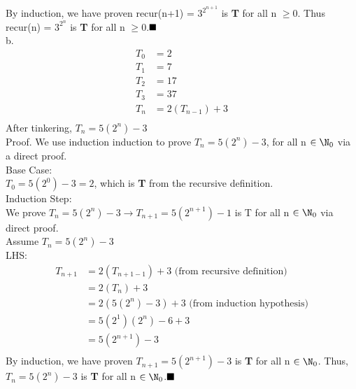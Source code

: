 \documentclass{article}
\begin{document}
\begin{itemize}
	By induction, we have proven recur(n+1) = $ 3^{2^{n+1}}$ is \textbf{T} for all n $\ge 0$. Thus recur(n) = $ 3^{2^n}$ is \textbf{T} for all n $\ge 0$.$\hfill\blacksquare$\\
b.
\begin{align*}
T_0 &= 2\\
T_1 &= 7\\
T_2 &= 17\\
T_3 &= 37\\ 
T_n &= 2(T_{n-1}) + 3\\
\end{align*}
After tinkering, $T_n = 5(2^n) - 3$\\
Proof.  We use induction induction to prove  $T_n = 5(2^n) - 3$, for all n $\in \N_0$ via a direct proof.\\
Base Case:\\
 $T_0 = 5(2^0) - 3 = 2$, which is \textbf{T} from the recursive definition.\\
 Induction Step:\\
 We prove  $T_n = 5(2^n) - 3 \rightarrow  T_{n+1} = 5(2^{n+1}) - 1$ is T for all n $\in \N_0$ via direct proof.\\
 Assume  $T_n = 5(2^n) - 3$\\
 LHS:\\
 \begin{align*}
  T_{n+1} &= 2(T_{n + 1 - 1}) + 3  \text{ (from recursive definition)}\\
  &= 2(T_n) + 3\\
  &= 2(5(2^n) - 3) + 3 \text{ (from induction hypothesis)}\\
  &= 5(2^1)(2^n) - 6 + 3\\
  &= 5(2^{n+1}) - 3\\
 \end{align*} 
By induction, we have proven $T_{n+1} = 5(2^{n+1}) - 3$ is \textbf{T} for all n $\in \N_0$. Thus,  $T_n = 5(2^n) - 3$ is \textbf{T} for all n $\in \N_0$.$\hfill\blacksquare$\\




\end{itemize}
\end{document}
